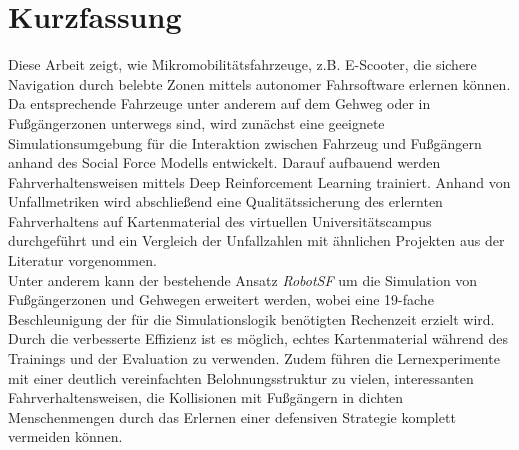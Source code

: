 \chapter*{Kurzfassung}

Diese Arbeit zeigt, wie Mikromobilitätsfahrzeuge, z.B. E-Scooter, die sichere Navigation
durch belebte Zonen mittels autonomer Fahrsoftware erlernen können. Da entsprechende
Fahrzeuge unter anderem auf dem Gehweg oder in Fußgängerzonen unterwegs sind, wird
zunächst eine geeignete Simulationsumgebung für die Interaktion zwischen Fahrzeug und
Fußgängern anhand des Social Force Modells entwickelt. Darauf aufbauend werden
Fahrverhaltensweisen mittels Deep Reinforcement Learning trainiert. Anhand von
Unfallmetriken wird abschließend eine Qualitätssicherung des erlernten Fahrverhaltens
auf Kartenmaterial des virtuellen Universitätscampus durchgeführt und ein Vergleich
der Unfallzahlen mit ähnlichen Projekten aus der Literatur vorgenommen.\\

Unter anderem kann der bestehende Ansatz \emph{RobotSF} \cite{machines11020268} um die
Simulation von Fußgängerzonen und Gehwegen erweitert werden, wobei eine 19-fache
Beschleunigung der für die Simulationslogik benötigten Rechenzeit erzielt wird. Durch die
verbesserte Effizienz ist es möglich, echtes Kartenmaterial während des Trainings und
der Evaluation zu verwenden. Zudem führen die Lernexperimente mit einer deutlich
vereinfachten Belohnungsstruktur zu vielen, interessanten Fahrverhaltensweisen, die Kollisionen
mit Fußgängern in dichten Menschenmengen durch das Erlernen einer defensiven Strategie komplett
vermeiden können.

\cleardoublepage
